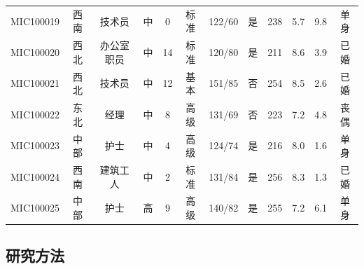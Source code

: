 \documentclass[a4paper]{ctexart}
\begin{document}
\begin{table}[H]
{\begin{tabular}{cccccccccccc}
MIC100019 & 西南 & 技术员 & 中 & 0 & 标准 & 122/60 & 是 & 238 & 5.7 & 9.8 & 单身 \\
MIC100020 & 西北 & 办公室职员 & 中 & 14 & 标准 & 120/80 & 是 & 211 & 8.6 & 3.9 & 已婚 \\
MIC100021 & 西北 & 技术员 & 中 & 12 & 基本 & 151/85 & 否 & 254 & 8.5 & 2.6 & 已婚 \\
MIC100022 & 东北 & 经理 & 中 & 8 & 高级 & 131/69 & 否 & 223 & 7.2 & 4.8 & 丧偶 \\
MIC100023 & 中部 & 护士 & 中 & 4 & 高级 & 124/74 & 是 & 216 & 8.0 & 1.6 & 单身 \\
MIC100024 & 西南 & 建筑工人 & 中 & 2 & 标准 & 131/84 & 是 & 256 & 8.3 & 1.3 & 已婚 \\
MIC100025 & 中部 & 护士 & 高 & 9 & 高级 & 140/82 & 是 & 255 & 7.2 & 6.1 & 单身 \\
\bottomrule
\end{tabular}%
}
\end{table}


\subsection{研究方法}
\end{document}
